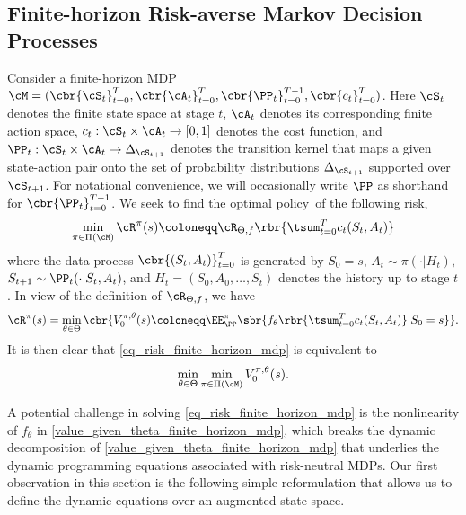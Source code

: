 \documentclass[9pt]{article}
\numberwithin{equation}{section}
\begin{document}
\subsection{Finite-horizon Risk-averse Markov Decision Processes}\label{sec_finite_mdp}
Consider a finite-horizon MDP 
$\cM = (
\cbr{\cS_t}_{t=0}^T, \cbr{\cA_t}_{t=0}^T, \cbr{\PP_t}_{t=0}^{T-1},
\cbr{c_t}_{t=0}^T
)
$.
Here $\cS_t$ denotes the finite state space at stage $t$,  $\cA_t$ denotes its corresponding finite action space,
 $c_t: \cS_t \times \cA_t \to [0,1]$ 
denotes the cost function, and
$\PP_t: \cS_t \times \cA_t \to \Delta_{\cS_{t+1}}$
denotes the transition kernel that maps a given state-action pair onto the set of  probability distributions $\Delta_{\cS_{t+1}}$ supported over $\cS_{t+1}$.
For notational convenience, we will occasionally write $\PP$ as shorthand for $\cbr{\PP_t}_{t=0}^{T-1}$.
We seek to find the optimal policy~of the following risk,
\begin{align}\label{eq_risk_finite_horizon_mdp}
    \min_{\pi \in \Pi(\cM)} \cR^\pi(s) \coloneqq
    \cR_{\Theta, f} \rbr{ \tsum_{t=0}^T c_t(S_t, A_t)}
\end{align}
where
the data process $\cbr{(S_t, A_t)}_{t=0}^T$ is generated by $S_0 = s$, $A_t \sim \pi(\cdot|H_t)$,  $S_{t+1} \sim \PP_t(\cdot|S_t, A_t)$,
and $H_t = (S_0, A_0, \ldots, S_t)$ denotes the history up to stage $t$.
In view of the definition of $\cR_{\Theta, f}$, we have 
\begin{align}\label{value_given_theta_finite_horizon_mdp}
    \cR^\pi (s) = \min_{\theta \in \Theta} \cbr{ V_0^{\pi, \theta}(s)
    \coloneqq \EE^\pi_\PP \sbr{f_\theta \rbr{\tsum_{t=0}^T c_t(S_t, A_t)} | S_0 = s} }.
\end{align}
It is then clear that  \eqref{eq_risk_finite_horizon_mdp} is equivalent to 
\begin{align}\label{finite_horizon_minmin_mdp}
    \min_{\theta \in \Theta} \min_{\pi \in \Pi(\cM)} V_0^{\pi, \theta}(s).
\end{align}





A potential challenge in solving \eqref{eq_risk_finite_horizon_mdp} is the nonlinearity of $f_\theta$ in \eqref{value_given_theta_finite_horizon_mdp}, which breaks the dynamic decomposition of \eqref{value_given_theta_finite_horizon_mdp} that underlies the dynamic programming equations associated with risk-neutral MDPs.
Our first observation in this section is the following  simple reformulation that allows us to define the dynamic equations over an augmented state space.
\end{document}
